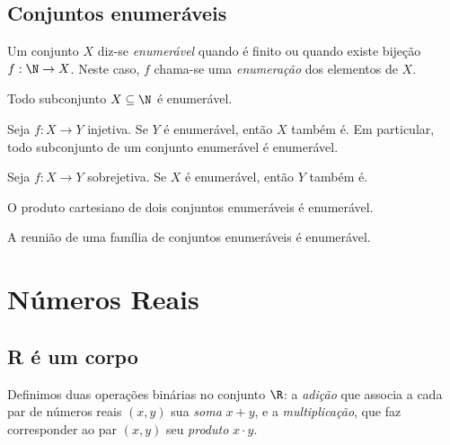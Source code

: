 \documentclass{article}
\begin{document}
\subsection{Conjuntos enumeráveis}

\begin{defn}
    Um conjunto \(X\) diz-se \emph{enumerável} quando é finito ou quando existe bijeção \(f: \N \to X\). Neste caso, \(f\) chama-se uma \emph{enumeração} dos elementos de \(X\).
\end{defn}

\begin{thm}
    Todo subconjunto \(X \subseteq \N\) é enumerável.
\end{thm}

\begin{cor}
    Seja \(f: X \to Y\) injetiva. Se \(Y\) é enumerável, então \(X\) também é. Em particular, todo subconjunto de um conjunto enumerável é enumerável.
\end{cor}

\begin{cor}
    Seja \(f: X \to Y\) sobrejetiva. Se \(X\) é enumerável, então \(Y\) também é.
\end{cor}

\begin{cor}
    O produto cartesiano de dois conjuntos enumeráveis é enumerável.
\end{cor}

\begin{cor}
    A reunião de uma família de conjuntos enumeráveis é enumerável.
\end{cor}

\section{Números Reais}

\subsection{R é um corpo}

\begin{defn} 
    Definimos duas operações binárias no conjunto \(\R\): a \emph{adição} que associa a cada par de números reais \((x,y)\) sua \emph{soma} \(x+y\), e a \emph{multiplicação}, que faz corresponder ao par \((x,y)\) seu \emph{produto} \(x \cdot y\).
\end{defn}
\end{document}
